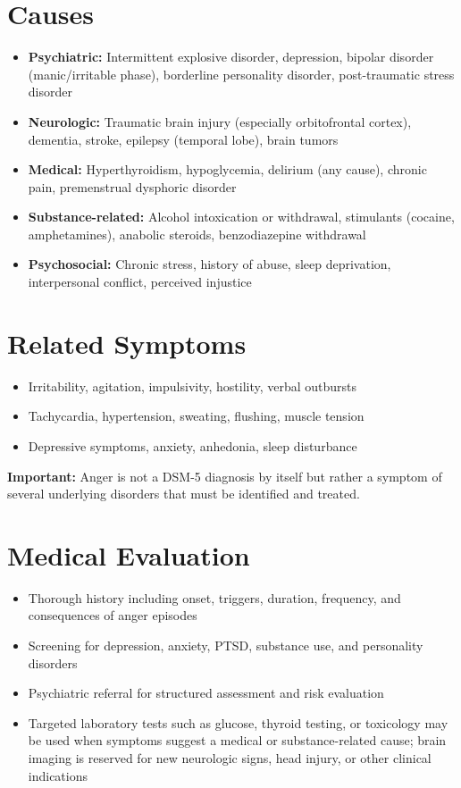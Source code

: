 \section*{Causes}
\begin{itemize}
 \item \textbf{Psychiatric:} Intermittent explosive disorder, depression, bipolar disorder (manic/irritable phase), borderline personality disorder, post-traumatic stress disorder
 \item \textbf{Neurologic:} Traumatic brain injury (especially orbitofrontal cortex), dementia, stroke, epilepsy (temporal lobe), brain tumors
 \item \textbf{Medical:} Hyperthyroidism, hypoglycemia, delirium (any cause), chronic pain, premenstrual dysphoric disorder
 \item \textbf{Substance-related:} Alcohol intoxication or withdrawal, stimulants (cocaine, amphetamines), anabolic steroids, benzodiazepine withdrawal
 \item \textbf{Psychosocial:} Chronic stress, history of abuse, sleep deprivation, interpersonal conflict, perceived injustice
\end{itemize}

\section*{Related Symptoms}
\begin{itemize}
 \item Irritability, agitation, impulsivity, hostility, verbal outbursts
 \item Tachycardia, hypertension, sweating, flushing, muscle tension
 \item Depressive symptoms, anxiety, anhedonia, sleep disturbance
\end{itemize}
\textbf{Important:} Anger is not a DSM-5 diagnosis by itself but rather a symptom of several underlying disorders that must be identified and treated.

\section*{Medical Evaluation}
\begin{itemize}
 \item Thorough history including onset, triggers, duration, frequency, and consequences of anger episodes
 \item Screening for depression, anxiety, PTSD, substance use, and personality disorders
 \item Psychiatric referral for structured assessment and risk evaluation
 \item Targeted laboratory tests such as glucose, thyroid testing, or toxicology may be used when symptoms suggest a medical or substance-related cause; brain imaging is reserved for new neurologic signs, head injury, or other clinical indications
\end{itemize}


